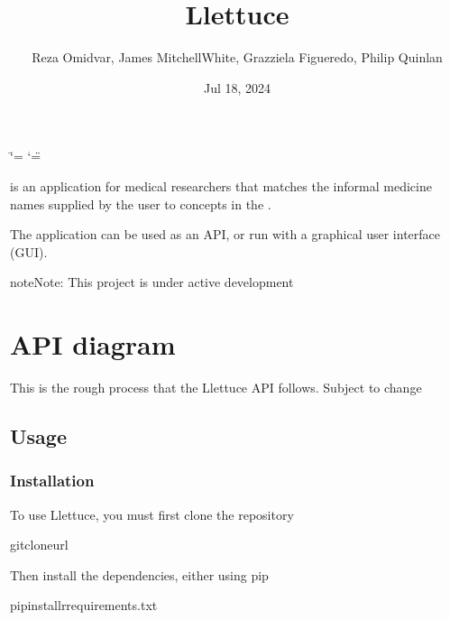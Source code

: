 \documentclass[letterpaper,10pt,english]{sphinxmanual}
\title{Llettuce}
\date{Jul 18, 2024}
\author{Reza Omidvar, James Mitchell\sphinxhyphen{}White, Grazziela Figueredo, Philip Quinlan}
\begin{document}
\ifdefined\shorthandoff
  \ifnum\catcode`\=\string=\active\shorthandoff{=}\fi
  \ifnum\catcode`\"=\active{}\fi
\fi

\pagestyle{empty}
\sphinxmaketitle
\pagestyle{plain}
\sphinxtableofcontents
\pagestyle{normal}
\label{\detokenize{index::doc}}


\sphinxAtStartPar
{} is an application for medical researchers that matches the informal medicine names supplied by the user to concepts in the  .

\sphinxAtStartPar
The application can be used as an API, or run with a graphical user interface (GUI).

\begin{sphinxadmonition}{note}{Note:}
\sphinxAtStartPar
This project is under active development
\end{sphinxadmonition}


\chapter{API diagram}
\label{\detokenize{index:api-diagram}}
\sphinxAtStartPar
This is the rough process that the Llettuce API follows. Subject to change

\sphinxstepscope


\section{Usage}
\label{\detokenize{usage:usage}}\label{\detokenize{usage::doc}}

\subsection{Installation}
\label{\detokenize{usage:installation}}
\sphinxAtStartPar
To use Llettuce, you must first clone the repository

\begin{sphinxVerbatim}[commandchars=\\\{\}]
gitclone\PYGZlt{}url\PYGZgt{}
\end{sphinxVerbatim}

\sphinxAtStartPar
Then install the dependencies, either using pip

\begin{sphinxVerbatim}[commandchars=\\\{\}]
pipinstall\PYGZhy{}rrequirements.txt
\end{sphinxVerbatim}
\end{document}
